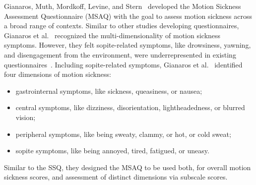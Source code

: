 Gianaros, Muth, Mordkoff, Levine, and Stern~\cite{Gianaros2001} developed the Motion Sickness Assessment
Questionnaire (MSAQ) with the goal to assess motion sickness across a broad range of contexts.
Similar to other studies developing questionnaires, Gianaros et al.~\cite{Gianaros2001} recognized the
multi-dimensionality of motion sickness symptoms.
However, they felt sopite-related symptoms, like drowsiness, yawning, and disengagement from the environment, were
underrepresented in existing questionnaires~\cite{Gianaros2001,Graybiel1976}.
Including sopite-related symptoms, Gianaros et al.~\cite{Gianaros2001} identified four dimensions of motion sickness:
\begin{itemize}
    \item gastrointernal symptoms, like sickness, queasiness, or nausea;
    \item central symptoms, like dizziness, disorientation, lightheadedness, or blurred vision;
    \item peripheral symptoms, like being sweaty, clammy, or hot, or cold sweat;
    \item sopite symptoms, like being annoyed, tired, fatigued, or uneasy.
\end{itemize}
Similar to the SSQ, they designed the MSAQ to be used both, for overall motion sickness scores, and assessment of 
distinct dimensions via subscale scores.
